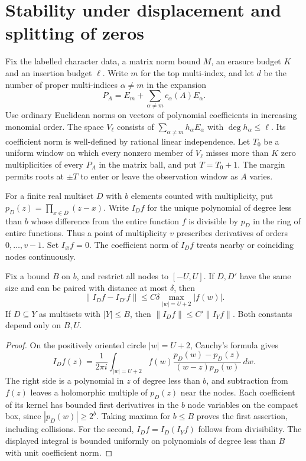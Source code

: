 \section{Stability under displacement and splitting of zeros}
\label{sec:stability}

Fix the labelled character data, a matrix norm bound $M$, an erasure budget $K$ and an insertion budget $\ell$. Write $m$ for the top multi-index, and let $d$ be the number of proper multi-indices $\alpha\ne m$ in the expansion
\[
 P_A=E_m+\sum_{\alpha\ne m} c_\alpha(A)E_\alpha.
\]
Use ordinary Euclidean norms on vectors of polynomial coefficients in increasing monomial order. The space $V_\ell$ consists of $\sum_{\alpha\ne m} h_\alpha E_\alpha$ with $\deg h_\alpha\le\ell$. Its coefficient norm is well-defined by rational linear independence. Let $T_0$ be a uniform window on which every nonzero member of $V_\ell$ misses more than $K$ zero multiplicities of every $P_A$ in the matrix ball, and put $T=T_0+1$. The margin permits roots at $\pm T$ to enter or leave the observation window as $A$ varies.

For a finite real multiset $D$ with $b$ elements counted with multiplicity, put $p_D(z)=\prod_{x\in D}(z-x)$. Write $I_D f$ for the unique polynomial of degree less than $b$ whose difference from the entire function $f$ is divisible by $p_D$ in the ring of entire functions. Thus a point of multiplicity $v$ prescribes derivatives of orders $0,\ldots,v-1$. Set $I_\varnothing f=0$. The coefficient norm of $I_Df$ treats nearby or coinciding nodes continuously.

\begin{lemma}\label{lem:stableinterpolation}
Fix a bound $B$ on $b$, and restrict all nodes to $[-U,U]$. If $D,D'$ have the same size and can be paired with distance at most $\delta$, then
\[
 \|I_Df-I_{D'}f\|\le C\delta\max_{|w|=U+2}|f(w)| .
\]
If $D\subseteq Y$ as multisets with $|Y|\le B$, then $\|I_D f\|\le C'\|I_Y f\|$. Both constants depend only on $B,U$.
\end{lemma}

\begin{proof}
On the positively oriented circle $|w|=U+2$, Cauchy's formula gives
\[
 I_D f(z)=\frac{1}{2\pi i}\int_{|w|=U+2}
 f(w)\frac{p_D(w)-p_D(z)}{(w-z)p_D(w)}\,dw .
\]
The right side is a polynomial in $z$ of degree less than $b$, and subtraction from $f(z)$ leaves a holomorphic multiple of $p_D(z)$ near the nodes. Each coefficient of its kernel has bounded first derivatives in the $b$ node variables on the compact box, since $|p_D(w)|\ge 2^b$. Taking maxima for $b\le B$ proves the first assertion, including collisions. For the second, $I_Df=I_D(I_Yf)$ follows from divisibility. The displayed integral is bounded uniformly on polynomials of degree less than $B$ with unit coefficient norm.
\end{proof}

